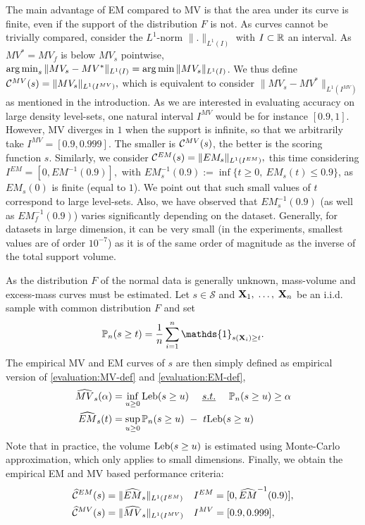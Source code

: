 The main advantage of EM compared to MV is that the area under its curve is finite, even if the support of the distribution $F$ is not.
As curves cannot be trivially compared, consider the $L^1$-norm $\|.\|_{L^1(I)}$ with $I\subset \mathbb{R}$ an interval. As $MV^*=MV_f$ is below $MV_s$ pointwise, $\argmin_s \| MV_s - MV^* \|_{L^1(I)} = \argmin \| MV_s \|_{L^1(I)} $. We thus define
$\mathcal{C}^{MV}(s) = \| MV_s \|_{L^1(I^{MV})},$ which is equivalent to consider $\| MV_s - MV^* \|_{L^1(I^{MV})}$ as mentioned in the introduction. As we are interested in evaluating accuracy on large density level-sets, one natural interval $I^{MV}$ would be for instance $[0.9, 1]$. However, MV diverges in $1$ when the support is infinite, so that we arbitrarily take $I^{MV} = [0.9, 0.999].$
The smaller is $\mathcal{C}^{MV}(s)$, the better is the scoring function $s$.
%
Similarly, we consider $\mathcal{C}^{EM}(s) = \| EM_s \|_{L^1(I^{EM})}, $ this time considering $I^{EM} = [0,EM^{-1}(0.9)],$ with $EM_s^{-1}(0.9) := \inf\{t\ge 0,~ EM_s(t) \le 0.9\}$, as $EM_s(0)$ is finite (equal to $1$). We point out that such small values of $t$ correspond to large level-sets. Also, we have observed that
$EM_s^{-1}(0.9)$ (as well as $EM_f^{-1}(0.9)$) varies significantly depending on the dataset. Generally, for datasets in large dimension, it can be %
very small (in the experiments, smallest values are of order $10^{-7}$) as it is of the same order of magnitude as the inverse of the total support volume.

As the distribution $F$ of the normal data is generally unknown, mass-volume and excess-mass curves must be estimated. Let $s\in \mathcal{S}$ and $\mathbf X_1,\; \ldots,\; \mathbf X_n$ be an i.i.d. sample with common distribution $F$ and set $$\mathbb{P}_n(s \ge t)=\frac{1}{n}\sum_{i=1}^n\mathds{1}_{s(\mb X_i)\geq t}.$$ The empirical MV and EM curves of $s$ are then simply defined as empirical version of \eqref{evaluation:MV-def} and \eqref{evaluation:EM-def}, 
\begin{align}
\label{evaluation:MV-def-emp}
\widehat{MV}_s(\alpha) &= \inf_{u \ge 0} \text{Leb}(s \ge u) ~~~~\emph{s.t.}{}~~~~ \mathbb{P}_n(s \ge u) \ge \alpha\\
\label{evaluation:EM-def-emp}
\widehat{EM}_s(t) &= \sup_{u \ge 0} \mathbb{P}_n(s \ge u) ~-~ t \text{Leb}(s \ge u)
\end{align}
%
Note that in practice, the volume $\text{Leb}(s \ge u)$ is estimated using Monte-Carlo approximation, which only applies to small dimensions.
%
Finally, we obtain the empirical EM and MV based performance criteria:
\begin{align}
\label{evaluation:eq:standard_emp_EM}\widehat{\mathcal{C}}^{EM}(s) &= \| \widehat{EM}_s \|_{L^1(I^{EM})}  &&I^{EM} = [0,\widehat{EM}^{-1}(0.9)],\\
\label{evaluation:eq:standard_emp_MV}\widehat{\mathcal{C}}^{MV}(s) &= \| \widehat{MV}_s \|_{L^1(I^{MV})}  &&I^{MV} = [0.9, 0.999],
\end{align}

